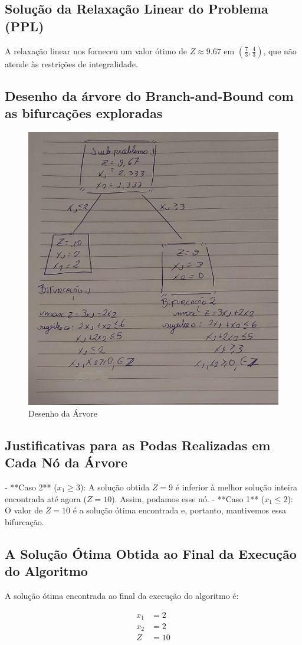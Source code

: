 \documentclass{article}
\begin{document}
\subsection{Solução da Relaxação Linear do Problema (PPL)}

A relaxação linear nos forneceu um valor ótimo de \(Z \approx 9.67\) em \(\left(\frac{7}{3}, \frac{4}{3}\right)\), que não atende às restrições de integralidade.

\subsection{Desenho da árvore do Branch-and-Bound com as bifurcações exploradas}

\begin{figure}
    \centering
    \includegraphics[width=0.5\linewidth]{arvore.jpg}
    \caption{Desenho da Árvore}
    \label{fig:enter-label}
\end{figure}

\newpage
\subsection{ Justificativas para as Podas Realizadas em Cada Nó da Árvore}

- **Caso 2** (\(x_1 \geq 3\)): A solução obtida \(Z = 9\) é inferior à melhor solução inteira encontrada até agora (\(Z = 10\)). Assim, podamos esse nó.
- **Caso 1** (\(x_1 \leq 2\)): O valor de \(Z = 10\) é a solução ótima encontrada e, portanto, mantivemos essa bifurcação.

\subsection{ A Solução Ótima Obtida ao Final da Execução do Algoritmo}

A solução ótima encontrada ao final da execução do algoritmo é:

\begin{align}
x_1 & = 2 \\
x_2 & = 2 \\
Z & = 10
\end{align}
\end{document}
